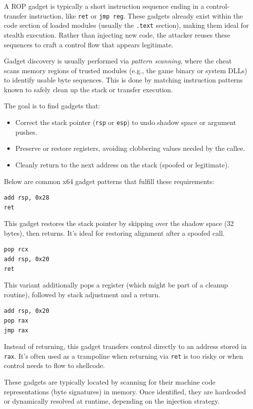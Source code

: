 A ROP gadget is typically a short instruction sequence ending in a control-transfer instruction, like \texttt{ret} or \texttt{jmp reg}. These gadgets already exist within the code section of loaded modules (usually the \texttt{.text} section), making them ideal for stealth execution. Rather than injecting new code, the attacker reuses these sequences to craft a control flow that appears legitimate.

Gadget discovery is usually performed via \emph{pattern scanning}, where the cheat scans memory regions of trusted modules (e.g., the game binary or system DLLs) to identify usable byte sequences. This is done by matching instruction patterns known to safely clean up the stack or transfer execution.

The goal is to find gadgets that:
\begin{itemize}
    \item Correct the stack pointer (\texttt{rsp} or \texttt{esp}) to undo shadow space or argument pushes.
    \item Preserve or restore registers, avoiding clobbering values needed by the callee.
    \item Cleanly return to the next address on the stack (spoofed or legitimate).
\end{itemize}

Below are common x64 gadget patterns that fulfill these requirements:
\begin{lstlisting}[style=asmstyle]
add rsp, 0x28
ret
\end{lstlisting}
This gadget restores the stack pointer by skipping over the shadow space (32 bytes), then returns. It's ideal for restoring alignment after a spoofed call.

\begin{lstlisting}[style=asmstyle]
pop rcx
add rsp, 0x20
ret
\end{lstlisting}
This variant additionally pops a register (which might be part of a cleanup routine), followed by stack adjustment and a return.

\begin{lstlisting}[style=asmstyle]
add rsp, 0x20
pop rax
jmp rax
\end{lstlisting}
Instead of returning, this gadget transfers control directly to an address stored in \texttt{rax}. It's often used as a trampoline when returning via \texttt{ret} is too risky or when control needs to flow to shellcode.

These gadgets are typically located by scanning for their machine code representations (byte signatures) in memory. Once identified, they are hardcoded or dynamically resolved at runtime, depending on the injection strategy.


